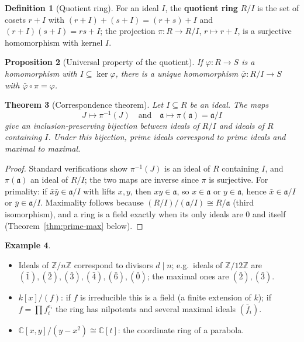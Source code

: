 \documentclass[11pt,a4paper]{article}
\newtheorem{theorem}{Theorem}[section]
\newtheorem{proposition}[theorem]{Proposition}
\theoremstyle{definition}
\newtheorem{definition}[theorem]{Definition}
\newtheorem{example}[theorem]{Example}
\newcommand{\Z}{\mathbb{Z}}
\newcommand{\C}{\mathbb{C}}
\newcommand{\fa}{\mathfrak{a}}
\begin{document}
	\begin{definition}[Quotient ring]
		For an ideal $I$, the \textbf{quotient ring} $R/I$ is the set of cosets $r+I$ with
		$(r+I)+(s+I)=(r+s)+I$ and $(r+I)(s+I)=rs+I$; the projection $\pi:R\to R/I$, $r\mapsto r+I$, is a
		surjective homomorphism with kernel $I$.
	\end{definition}
	
	\begin{proposition}[Universal property of the quotient]
		If $\varphi:R\to S$ is a homomorphism with $I\subseteq\ker\varphi$, there is a unique homomorphism
		$\bar\varphi:R/I\to S$ with $\bar\varphi\circ\pi=\varphi$.
	\end{proposition}
	
	\begin{theorem}[Correspondence theorem]\label{thm:correspondence}
		Let $I\subseteq R$ be an ideal. The maps
		\[
		J\longmapsto \pi^{-1}(J)\quad\text{and}\quad \fa\longmapsto \pi(\fa)=\fa/I
		\]
		give an inclusion-preserving bijection between ideals of $R/I$ and ideals of $R$ containing $I$.
		Under this bijection, prime ideals correspond to prime ideals and maximal to maximal.
	\end{theorem}
	\begin{proof}
		Standard verifications show $\pi^{-1}(J)$ is an ideal of $R$ containing $I$, and $\pi(\fa)$ an ideal
		of $R/I$; the two maps are inverse since $\pi$ is surjective. For primality: if $\bar x\bar y\in\fa/I$
		with lifts $x,y$, then $xy\in\fa$, so $x\in\fa$ or $y\in\fa$, hence $\bar x\in\fa/I$ or $\bar y\in\fa/I$.
		Maximality follows because $(R/I)/(\fa/I)\cong R/\fa$ (third isomorphism), and a ring is a field
		exactly when its only ideals are $0$ and itself (Theorem~\ref{thm:prime-max} below).
	\end{proof}
	
	\begin{example}
		\begin{itemize}
			\item Ideals of $\Z/n\Z$ correspond to divisors $d\mid n$; e.g.\ ideals of $\Z/12\Z$ are
			$(\bar1),(\bar2),(\bar3),(\bar4),(\bar6),(\bar0)$; the maximal ones are $(\bar2),(\bar3)$.
			\item $k[x]/(f)$: if $f$ is irreducible this is a field (a finite extension of $k$); if
			$f=\prod f_i^{e_i}$ the ring has nilpotents and several maximal ideals $(\bar f_i)$.
			\item $\C[x,y]/(y-x^2)\cong\C[t]$: the coordinate ring of a parabola.
		\end{itemize}
	\end{example}
	
\end{document}
